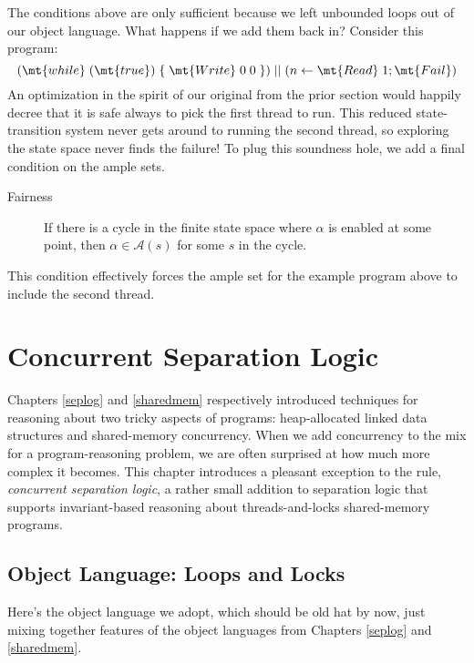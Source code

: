 \documentclass{amsbook}
\theoremstyle{definition}
\theoremstyle{remark}
\numberwithin{section}{chapter}
\numberwithin{equation}{chapter}
\begin{document}
The conditions above are only sufficient because we left unbounded loops out of our object language.
What happens if we add them back in?
Consider this program:
$$(\mt{while} \; (\mt{true}) \; \{ \; \mt{Write} \; 0 \; 0 \; \}) \; || \; (n \leftarrow \mt{Read} \; 1; \mt{Fail})$$
An optimization in the spirit of our original from the prior section would happily decree that it is safe always to pick the first thread to run.
This reduced state-transition system never gets around to running the second thread, so exploring the state space never finds the failure!
To plug this soundness hole, we add a final condition on the ample sets.

\begin{description}
  \item[Fairness] If there is a cycle in the finite state space where $\alpha$ is enabled at some point, then $\alpha \in \mathcal A(s)$ for some $s$ in the cycle.
\end{description}

This condition effectively forces the ample set for the example program above to include the second thread.



\chapter{Concurrent Separation Logic}

Chapters \ref{seplog} and \ref{sharedmem} respectively introduced techniques for reasoning about two tricky aspects of programs: heap-allocated linked data structures and shared-memory concurrency.
When we add concurrency to the mix for a program-reasoning problem, we are often surprised at how much more complex it becomes.
This chapter introduces a pleasant exception to the rule, \emph{concurrent separation logic}, a rather small addition to separation logic that supports invariant-based reasoning about threads-and-locks shared-memory programs.

\section{Object Language: Loops and Locks}

Here's the object language we adopt, which should be old hat by now, just mixing together features of the object languages from Chapters \ref{seplog} and \ref{sharedmem}.
\end{document}
